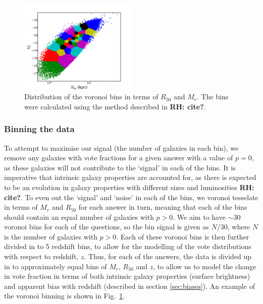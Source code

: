 \documentclass[useAMS,usenatbib]{mn2e}
\newcommand{\rh}[1]{{\bf \textcolor{RoyalPurple}{RH: #1}}}
\begin{document}
\begin{figure}
		\centering

        \includegraphics[width=0.5\textwidth]{Bias_imgs/voronoi_bins.pdf}

        \caption{Distribution of the voronoi bins in terms of $R_{50}$ and $M_r$. The bins were calculated using the method described in \rh{cite?}.}

        \label{fig:voronoi_bins}

\end{figure}

\subsubsection{Binning the data}

To attempt to maximise our signal (the number of galaxies in each bin), we remove any galaxies with vote fractions for a given answer with a value of $p=0$, as these galaxies will not contribute to the `signal' in each of the bins. It is imperative that intrinsic galaxy properties are accounted for, as there is expected to be an evolution in galaxy properties with different sizes and luminosities \rh{cite?}. To even out the `signal' and `noise' in each of the bins, we voronoi tesselate in terms of $M_r$ and $R_{50}$ for each answer in turn, meaning that each of the bins should contain an equal number of galaxies with $p>0$. We aim to have $\sim 30$ voronoi bins for each of the questions, so the bin signal is given as $N/30$, where $N$ is the number of galaxies with $p>0$. Each of these voronoi bins is then further divided in to 5 redshift bins, to allow for the modelling of the vote distributions with respect to redshift, $z$. Thus, for each of the answers, the data is divided up in to approximately equal bins of $M_r$, $R_{50}$ and $z$, to allow us to model the change in vote fraction in terms of both intrinsic galaxy properties (surface brightness) and apparent bias with redshift (described in section \ref{sec:biases}). An example of the voronoi binning is shown in Fig.~\ref{fig:voronoi_bins}.
\end{document}
